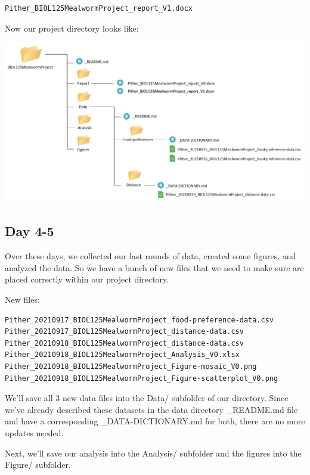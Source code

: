 \documentclass[
]{book}
\begin{document}
\begin{verbatim}
Pither_BIOL125MealwormProject_report_V1.docx
\end{verbatim}

Now our project directory looks like:

\includegraphics{images/DS_directory-example-3.png}

\hypertarget{day-4-5}{%
\subsection*{Day 4-5}\label{day-4-5}}

Over these days, we collected our last rounds of data, created some figures, and analyzed the data. So we have a bunch of new files that we need to make sure are placed correctly within our project directory.

New files:

\begin{verbatim}
Pither_20210917_BIOL125MealwormProject_food-preference-data.csv
Pither_20210917_BIOL125MealwormProject_distance-data.csv
Pither_20210918_BIOL125MealwormProject_distance-data.csv
Pither_20210918_BIOL125MealwormProject_Analysis_V0.xlsx
Pither_20210918_BIOL125MealwormProject_Figure-mosaic_V0.png
Pither_20210918_BIOL125MealwormProject_Figure-scatterplot_V0.png
\end{verbatim}

We'll save all 3 new data files into the Data/ subfolder of our directory. Since we've already described these datasets in the data directory \_README.md file and have a corresponding \_DATA-DICTIONARY.md for both, there are no more updates needed.

Next, we'll save our analysis into the Analysis/ subfolder and the figures into the Figure/ subfolder.
\end{document}
